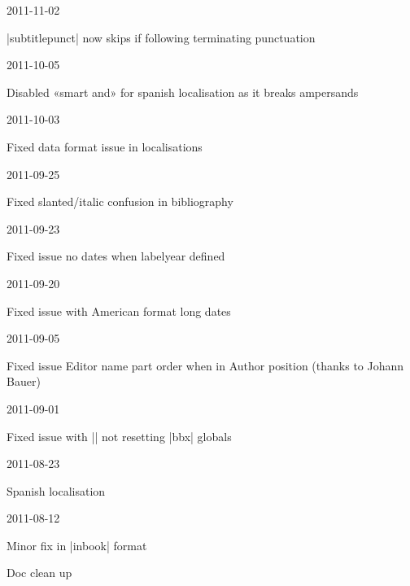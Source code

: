 \documentclass{ltxdockit}
\begin{document}
\begin{changelog}
\begin{release}{4.1}{2011-11-02}
\item |subtitlepunct| now skips if following terminating punctuation
\end{release}

\begin{release}{4.0}{2011-10-05}
\item Disabled «smart and» for spanish localisation as it breaks ampersands
\end{release}

\begin{release}{3.9}{2011-10-03}
\item Fixed data format issue in localisations
\end{release}

\begin{release}{3.8}{2011-09-25}
\item Fixed slanted/italic confusion in bibliography
\end{release}

\begin{release}{3.7}{2011-09-23}
\item Fixed issue no dates when labelyear defined
\end{release}

\begin{release}{3.6}{2011-09-20}
\item Fixed issue with American format long dates
\end{release}

\begin{release}{3.5}{2011-09-05}
\item Fixed issue Editor name part order when in Author position (thanks to
  Johann Bauer)
\end{release}

\begin{release}{3.4}{2011-09-01}
\item Fixed issue with |\fullcite| not resetting |bbx| globals
\end{release}

\begin{release}{3.3}{2011-08-23}
\item Spanish localisation
\end{release}

\begin{release}{3.2}{2011-08-12}
\item Minor fix in |inbook| format
\item Doc clean up
\end{release}


\end{changelog}
\end{document}
